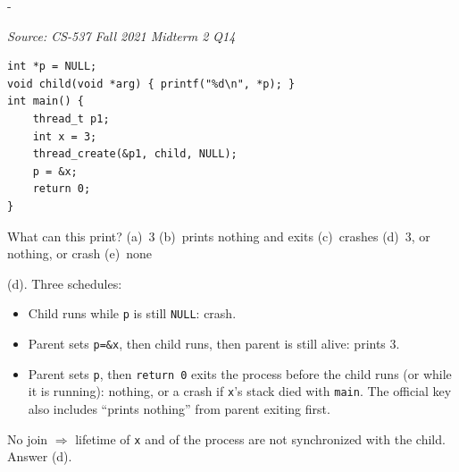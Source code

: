 \documentclass[11pt,a4paper]{article}
\makeatletter
\newcommand{\keepspace}[1]{\par\penalty-100\begingroup
  \setlength{\dimen@}{#1}\dimen@ii\pagegoal\advance\dimen@ii-\pagetotal
  \ifdim\dimen@>\dimen@ii\ifdim\dimen@ii>\z@\vfil\fi\break\fi\endgroup}
\newcounter{qn}[section]
\newenvironment{Qn}[4]{%
  \refstepcounter{qn}\keepspace{7\baselineskip}%
  \begin{tcolorbox}[qboxstyle, title={Q\thesection.\theqn\ \ [#1 \textbar\ #2]\ \ #4}]%
  {\footnotesize\color{g3}\textit{Source: #3}}\par\smallskip%
}{%
  \end{tcolorbox}%
}
\newenvironment{Sol}{%
  \begin{tcolorbox}[sboxstyle, title={Solution}]%
}{%
  \end{tcolorbox}\vspace{0.35em}%
}
\makeatother
\begin{document}
\begin{Qn}{Medium-Hard}{Lect 16}{CS-537 Fall 2021 Midterm 2 Q14}{Child prints \texttt{*p} before \texttt{p} is set}
\begin{lstlisting}[numbers=none]
int *p = NULL;
void child(void *arg) { printf("%d\n", *p); }
int main() {
    thread_t p1;
    int x = 3;
    thread_create(&p1, child, NULL);
    p = &x;
    return 0;
}
\end{lstlisting}

What can this print? (a)~3 \quad (b)~prints nothing and exits \quad (c)~crashes \quad (d)~3, or nothing, or crash \quad (e)~none
\end{Qn}
\begin{Sol}
(d). Three schedules:
\begin{itemize}
\item Child runs while \texttt{p} is still \texttt{NULL}: crash.
\item Parent sets \texttt{p=\&x}, then child runs, then parent is still alive: prints 3.
\item Parent sets \texttt{p}, then \texttt{return 0} exits the process before the child runs (or while it is running): nothing, or a crash if \texttt{x}'s stack died with \texttt{main}. The official key also includes ``prints nothing'' from parent exiting first.
\end{itemize}
No join $\Rightarrow$ lifetime of \texttt{x} and of the process are not synchronized with the child. Answer (d).
\end{Sol}
\end{document}
